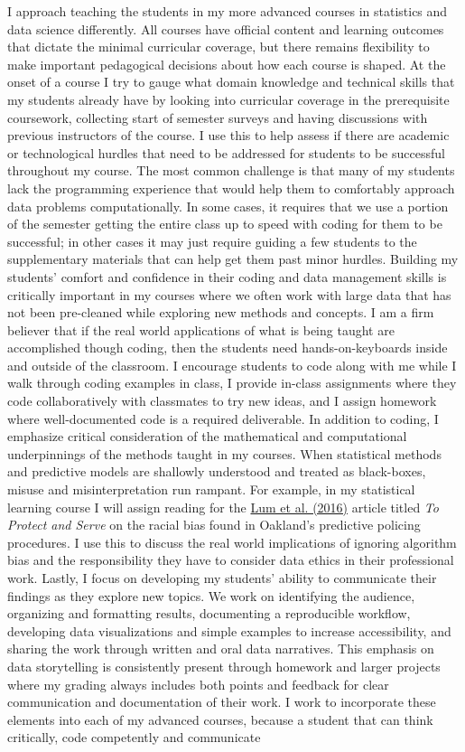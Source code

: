 \documentclass[letterpaper,12pt]{article}\usepackage[]{graphicx}\usepackage[]{color}
\begin{document}
I approach teaching the students in my more advanced courses in statistics and data science differently. All courses have official content and learning outcomes that dictate the minimal curricular coverage, but there remains flexibility to make important pedagogical decisions about how each course is shaped. At the onset of a course I try to gauge what domain knowledge and technical skills that my students already have by looking into curricular coverage in the prerequisite coursework, collecting start of semester surveys and having discussions with previous instructors of the course. I use this to help assess if there are academic or technological hurdles that need to be addressed for students to be successful throughout my course. The most common challenge is that many of my students lack the programming experience that would help them to comfortably approach data problems computationally. In some cases, it requires that we use a portion of the semester getting the entire class up to speed with coding for them to be successful; in other cases it may just require guiding a few students to the supplementary materials that can help get them past minor hurdles. Building my students' comfort and confidence in their coding and data management skills is critically important in my courses where we often work with large data that has not been pre-cleaned while exploring new methods and concepts. I am a firm believer that if the real world applications of what is being taught are accomplished though coding, then the students need hands-on-keyboards inside and outside of the classroom. I encourage students to code along with me while I walk through coding examples in class, I provide in-class assignments where they code collaboratively with classmates to try new ideas, and I assign homework where well-documented code is a required deliverable. In addition to coding, I emphasize critical consideration of the mathematical and computational underpinnings of the methods taught in my courses. When statistical methods and predictive models are shallowly understood and treated as black-boxes, misuse and misinterpretation run rampant. For example, in my statistical learning course I will assign reading for the \href{https://rss.onlinelibrary.wiley.com/doi/epdf/10.1111/j.1740-9713.2016.00960.x}{Lum et al. (2016)} article titled {\it To Protect and Serve} on the racial bias found in Oakland's predictive policing procedures. I use this to discuss the real world implications of ignoring algorithm bias and the responsibility they have to consider data ethics in their professional work. Lastly, I focus on developing my students' ability to communicate their findings as they explore new topics. We work on identifying the audience, organizing and formatting results, documenting a reproducible workflow, developing data visualizations and simple examples to increase accessibility, and sharing the work through written and oral data narratives. This emphasis on data storytelling is consistently present through homework and larger projects where my grading always includes both points and feedback for clear communication and documentation of their work. I work to incorporate these elements into each of my advanced courses, because a student that can think critically, code competently and communicate 
\end{document}
